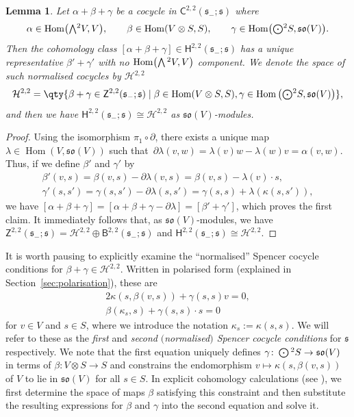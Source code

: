 \documentclass[10pt,a4paper]{amsart}
\numberwithin{equation}{section}
\newtheorem{Lemma}[Theorem]{Lemma}
\newcommand{\fs}{\mathfrak{s}}
\newcommand{\fso}{\mathfrak{so}}
\newcommand{\cH}{\mathcal{H}}
\newcommand{\ssB}{\mathsf{B}}
\newcommand{\ssC}{\mathsf{C}}
\newcommand{\ssH}{\mathsf{H}}
\newcommand{\ssZ}{\mathsf{Z}}
\newcommand{\Wedge}{\mathchoice{{\textstyle\bigwedge}}{\bigwedge}{\bigwedge}{\bigwedge}}	%
\newcommand{\Odot}{\mathchoice{{\textstyle\bigodot}}{\bigodot}{\bigodot}{\bigodot}}
\newcommand{\1}{\mathbbm{1}}
\DeclareMathOperator{\Hom}{Hom}
\begin{document}
\begin{Lemma} \label{lemma:H22-full-flat-model}
	Let $\alpha+\beta+\gamma$ be a cocycle in $\ssC^{2,2}(\fs_-;\fs)$ where
	\begin{align}\label{eq:22-cocycle-comps}
		\alpha\in\Hom\bigl(\Wedge^2V,V\bigr),
		\qquad\beta\in\Hom(V\otimes S,S),
		\qquad\gamma\in\Hom\bigl(\Odot^2S,\fso(V)\bigr).
	\end{align}
	Then the cohomology class $[\alpha+\beta+\gamma]\in \ssH^{2,2}(\fs_-;\fs)$ has a unique representative $\beta'+\gamma'$ with no $\Hom\bigl(\Wedge^2 V,V\bigr)$ component. We denote the space of such \emph{normalised cocycles} by $\cH^{2,2}$
	\[
		\cH^{2,2}
		= \qty{\beta+\gamma \in \ssZ^{2,2}(\fs_-;\fs)
			 \mid
				\beta\in\Hom(V\otimes S,S), \gamma\in\Hom\big(\Odot^2S,\fso(V)\big)
			},
	\]
	and then we have
$\ssH^{2,2}(\fs_-;\fs) \cong \cH^{2,2}
$
	as $\fso(V)$-modules.
\end{Lemma}

\begin{proof}
	Using the isomorphism $\pi_1\circ\partial$, there exists a unique map $\lambda\in\Hom(V,\fso(V))$ such that~${\partial\lambda(v,w)=\lambda(v)w - \lambda(w)v = \alpha(v,w)}$.
	Thus, if we define $\beta'$ and $\gamma'$ by
	\begin{gather*}%
		\beta'(v,s) = \beta(v,s) - \partial\lambda(v,s)
			= \beta(v,s) - \lambda(v)\cdot s,\\
		\gamma'(s,s') = \gamma(s,s') - \partial\lambda(s,s')
			= \gamma(s,s) + \lambda(\kappa(s,s')),
	\end{gather*}
	we have
$[\alpha+\beta+\gamma]
		= [\alpha+\beta+\gamma-\partial\lambda]
		= [\beta' + \gamma']$,
	which proves the first claim. It immediately follows that, as $\fso(V)$-modules, we have $\ssZ^{2,2}(\fs_-;\fs)=\cH^{2,2}\oplus\ssB^{2,2}(\fs_-;\fs)$ and $\ssH^{2,2}(\fs_-;\fs) \cong \cH^{2,2}$.
\end{proof}

It is worth pausing to explicitly examine the ``normalised'' Spencer cocycle conditions for $\beta+\gamma\in\cH^{2,2}$. Written in polarised form (explained in Section~\ref{sec:polarisation}), these are
\begin{gather}
	2\kappa(s,\beta(v,s)) + \gamma(s,s)v = 0, \label{eq:cocycle-1}	\\
	\beta(\kappa_s,s) + \gamma(s,s)\cdot s = 0	\label{eq:cocycle-2}
\end{gather}
for $v\in V$ and $s\in S$, where we introduce the notation $\kappa_s:=\kappa(s,s)$. We will refer to these as the \emph{first} and \emph{second} \emph{$($normalised$)$ Spencer cocycle conditions} for $\fs$ respectively. We note that the first equation uniquely defines $\gamma\colon\Odot^2S\to\fso(V)$ in terms of $\beta\colon V\otimes S\to S$ and constrains the endomorphism $v\mapsto \kappa(s,\beta(v,s))$ of $V$ to lie in $\fso(V)$ for all $s\in S$. In explicit cohomology calculations (see \cite{Beckett2021,deMedeiros2016,deMedeiros2018,Figueroa-OFarrill2017}), we first determine the space of maps $\beta$ satisfying this constraint and then substitute the resulting expressions for $\beta$ and $\gamma$ into the second equation and solve it.
\end{document}
